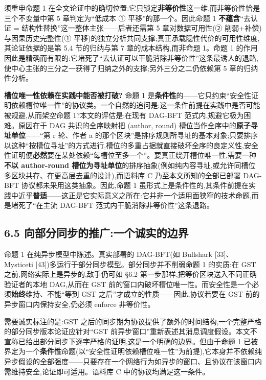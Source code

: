 \documentclass[UTF8,fontset=windows,a4paper,11pt]{ctexart}
\begin{document}
须重申命题 1
在全文论证中的确切位置:它只锁定\textbf{非等价性}这一维,而非等价性恰是三个不变量中第
5 章判定为``低成本 ① 平移''的那一个。因此命题 1 \textbf{不蕴含}``去认证
= 结构性替换''这一整体主张------后者还需第 5 章对数据可用性(②
削弱+补偿)与因果历史完整性(①
平移)的独立分析共同支撑;真正承载隐性代价的可用性维度,其论证依据的是第
5.4 节的归纳与第 7 章的成本结构,而非命题 1。命题 1
的作用因此是精确而有限的:它堵死了``去认证可以干脆消除非等价性''这条最诱人的退路,使中心主张的三分之一获得了归纳之外的支撑;另外三分之二仍依赖第
5 章的归纳性分析。

\textbf{槽位唯一性依赖在实践中能否被打破?}
命题 1 是\textbf{条件性}的------它只约束``安全性证明依赖槽位唯一性''的协议类。一个自然的追问是:这一条件前提在实践中是否可能被规避,从而架空命题
1?本文的评估是:在现有 DAG-BFT 范式内,规避它极为困难。原因在于 DAG
共识的全序映射把 (author, round) 槽位当作全序中的\textbf{原子寻址单位}------``第
r 轮、作者 a
的那个区块''是排序规则所寻址的基本对象;只要排序以这种``按槽位寻址''的方式进行,槽位的多重占据就直接破坏全序的良定义性,安全性证明便\textbf{必然}要在某处依赖``每槽位至多一个''。要真正绕开槽位唯一性,需要一种\textbf{不以
author-round 槽位为寻址单位}的排序抽象(例如纯内容寻址,或允许同槽位多区块共存、在更高层去重的设计),而语料库
C 乃至本文所知的全部已部署 DAG-BFT
协议都未采用这类抽象。因此,命题 1
虽形式上是条件性的,其条件前提在实践中近乎\textbf{普适}------这正是它实际意义之所在:它并非一个适用面狭窄的技术命题,而是堵死了``在主流
DAG-BFT 范式内干脆消除非等价性''这条退路。

\subsection{6.5
向部分同步的推广:一个诚实的边界}\label{ux5411ux90e8ux5206ux540cux6b65ux7684ux63a8ux5e7fux4e00ux4e2aux8bdaux5b9eux7684ux8fb9ux754c}

命题 1 在纯异步模型中陈述。真实部署的 DAG-BFT(如 Bullshark
{[}33{]}、Mysticeti {[}43{]})多运行于部分同步模型。部分同步并不削弱命题
1 的实质:在 GST 之前,网络实际上是异步的,敌手仍可如 §6.2
第一步那样,把等价区块送入不同正确验证者的本地 DAG,从而在 GST
前的窗口内破坏槽位唯一性。而安全性是一个必须\textbf{始终}维持、不能``等到
GST 之后''才成立的性质------因此,协议若要在 GST
前的异步窗口内保持安全,仍必须 enforce 非等价性。

需要诚实标注的是:GST
之后的同步期为协议提供了额外的时间结构,一个完整严格的部分同步版本论证应针对``GST
前异步窗口''重新表述其消息调度假设。本文不宣称已给出部分同步下逐字严格的证明,这是一个明确的边界。但由于命题
1
已被界定为一个\textbf{条件性}命题(以``安全性证明依赖槽位唯一性''为前提),它本身并不依赖纯异步假设的全部强度------只要存在一个网络行为如异步的窗口、且协议在该窗口内需维持安全,论证即可适用。语料库
C 中的协议均满足这一条件。
\end{document}
